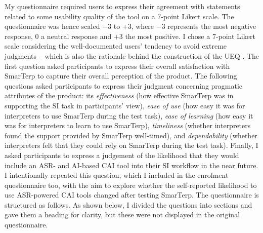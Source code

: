 My questionnaire required users to express their agreement with statements related to some usability quality of the tool on a 7-point Likert scale. The questionnaire was hence scaled $-$3 to +3, where $-$3 represents the most negative response, 0 a neutral response and +3 the most positive. I chose a 7-point Likert scale considering the well-documented users’ tendency to avoid extreme judgments -- which is also the rationale behind the construction of the UEQ \citep{laugwitz2008construction}. The first question asked participants to express their overall satisfaction with SmarTerp to capture their overall perception of the product. The following questions asked participants to express their judgment concerning pragmatic attributes of the product: its \textit{effectiveness} (how effective SmarTerp was in supporting the SI task in participants’ view), \textit{ease of use} (how easy it was for interpreters to use SmarTerp during the test task), \textit{ease of learning} (how easy it was for interpreters to learn to use SmarTerp), \textit{timeliness} (whether interpreters found the support provided by SmarTerp well-timed), and \textit{dependability} (whether interpreters felt that they could rely on SmarTerp during the test task). Finally, I asked participants to express a judgement of the likelihood that they would include an ASR- and AI-based CAI tool into their SI workflow in the near future. I intentionally repeated this question, which I included in the enrolment questionnaire too, with the aim to explore whether the self-reported likelihood to use ASR-powered CAI tools changed after testing SmarTerp. The questionnaire is structured as follows. As shown below, I divided the questions into sections and gave them a heading for clarity, but these were not displayed in the original questionnaire.

